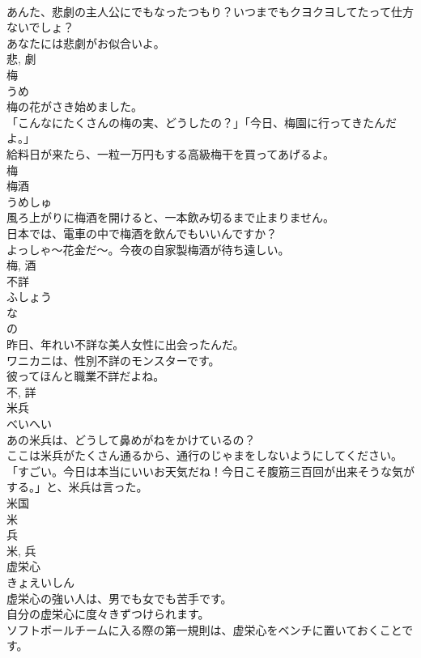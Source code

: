 \documentclass[8pt]{extreport}
\begin{document}
\begin{CJK}{UTF8}{min}
\\	あんた、悲劇の主人公にでもなったつもり？いつまでもクヨクヨしてたって仕方ないでしょ？	
\\	あなたには悲劇がお似合いよ。	
\\	悲, 劇	
\\	梅	
\\	うめ	
\\	梅の花がさき始めました。	
\\	「こんなにたくさんの梅の実、どうしたの？」「今日、梅園に行ってきたんだよ。」	
\\	給料日が来たら、一粒一万円もする高級梅干を買ってあげるよ。	
\\	梅	
\\	梅酒	
\\	うめしゅ	
\\	風ろ上がりに梅酒を開けると、一本飲み切るまで止まりません。	
\\	日本では、電車の中で梅酒を飲んでもいいんですか？	
\\	よっしゃ〜花金だ〜。今夜の自家製梅酒が待ち遠しい。	
\\	梅, 酒	
\\	不詳	
\\	ふしょう	
\\	な 
\\	の 
\\	昨日、年れい不詳な美人女性に出会ったんだ。	
\\	ワニカニは、性別不詳のモンスターです。	
\\	彼ってほんと職業不詳だよね。	
\\	不, 詳	
\\	米兵	
\\	べいへい	
\\	あの米兵は、どうして鼻めがねをかけているの？	
\\	ここは米兵がたくさん通るから、通行のじゃまをしないようにしてください。	
\\	「すごい。今日は本当にいいお天気だね！今日こそ腹筋三百回が出来そうな気がする。」と、米兵は言った。	
\\	米国 
\\	米 
\\	兵 
\\	米, 兵	
\\	虚栄心	
\\	きょえいしん	
\\	虚栄心の強い人は、男でも女でも苦手です。	
\\	自分の虚栄心に度々きずつけられます。	
\\	ソフトボールチームに入る際の第一規則は、虚栄心をベンチに置いておくことです。	

\end{CJK}
\end{document}
